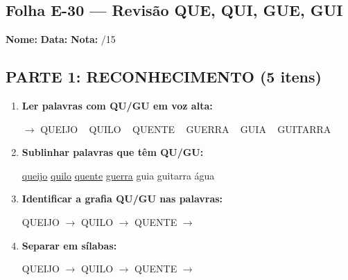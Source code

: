 \subsection{Folha E-30 --- Revisão QUE, QUI, GUE, GUI}
\begin{exercicio}



\noindent\textbf{Nome:} \underline{\hspace{3.2cm}} \quad \textbf{Data:} \underline{\hspace{1.6cm}} \quad \textbf{Nota:} \underline{\hspace{0.9cm}}/15


\subsection*{PARTE 1: RECONHECIMENTO (5 itens)}

\begin{enumerate}

  \item \textbf{Ler palavras com QU/GU em voz alta:}
  \begin{center}
  $\rightarrow$ QUEIJO ~ QUILO ~ QUENTE ~ GUERRA ~ GUIA ~ GUITARRA
  \end{center}

  \item \textbf{Sublinhar palavras que têm QU/GU:}

\begin{center}
  \uline{queijo} \quad \uline{quilo} \quad \uline{quente} \quad \uline{guerra} \quad guia \quad guitarra \quad água
\end{center}

  \item \textbf{Identificar a grafia QU/GU nas palavras:}
  \begin{center}
  QUEIJO $\rightarrow$ \underline{\hspace{1cm}} \quad QUILO $\rightarrow$ \underline{\hspace{1cm}} \quad QUENTE $\rightarrow$ \underline{\hspace{1cm}}
  \end{center}

  \item \textbf{Separar em sílabas:}
  \begin{center}
  QUEIJO $\rightarrow$ \underline{\hspace{1.2cm}} \quad QUILO $\rightarrow$ \underline{\hspace{1.2cm}} \quad QUENTE $\rightarrow$ \underline{\hspace{1.2cm}}
  \end{center}


\end{enumerate}
\end{exercicio}
